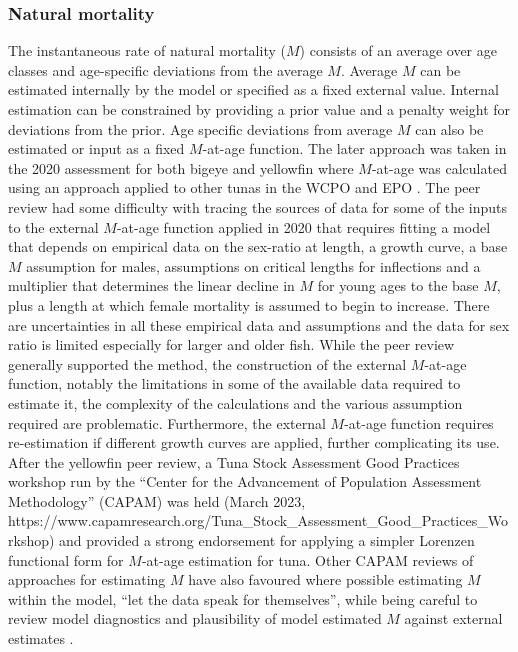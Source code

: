 \subsubsection{Natural mortality}
\label{sec:model_natmort}

The instantaneous rate of natural mortality ($M$) consists of an average over age classes and age-specific deviations from the average $M$. Average $M$ can be estimated internally by the model or specified as a fixed external value. Internal estimation can be constrained by providing a prior value and a penalty weight for deviations from the prior. Age specific deviations from average $M$ can also be estimated or input as a fixed  $M$-at-age function. The later approach was taken in the 2020 assessment for both bigeye and yellowfin \citep{ducharme-barth_stock_2020,vincent_stock_2020} where $M$-at-age was calculated using an approach applied to other tunas in the WCPO and EPO \citep{harley_simple_2003,hoyle_adjusted_2008,hoyle_sensitivity_2008}. The peer review had some difficulty with tracing the sources of data for some of the inputs to the external $M$-at-age function applied in 2020 that requires fitting a model that depends on empirical data on the sex-ratio at length, a growth curve, a base $M$ assumption for males, assumptions on critical lengths for inflections and a multiplier that determines the linear decline in $M$ for young ages to the base $M$, plus a length at which female mortality is assumed to begin to increase. There are uncertainties in all these empirical data and assumptions and the data for sex ratio is limited especially for larger and older fish. While the peer review generally supported the method, the construction of the external $M$-at-age function, notably the limitations in some of the available data  required to estimate it, the complexity of the calculations and the various assumption required are problematic. Furthermore, the external $M$-at-age function requires re-estimation if different growth curves are applied, further complicating its use. After the yellowfin peer review, a Tuna Stock Assessment Good Practices workshop run by the \enquote{Center for the Advancement of Population Assessment Methodology} (CAPAM) was held (March 2023, https://www.capamresearch.org/Tuna\_Stock\_Assessment\_Good\_Practices\_Workshop) and provided a strong endorsement for applying a simpler Lorenzen functional form for $M$-at-age estimation for tuna. Other CAPAM reviews of approaches for estimating $M$ have also favoured where possible estimating $M$ within the model, \enquote{let the data speak for themselves}, while being careful to review model diagnostics and plausibility of model estimated $M$ against external estimates \citep{hamel_natural_2023,punt_those_2023}.

